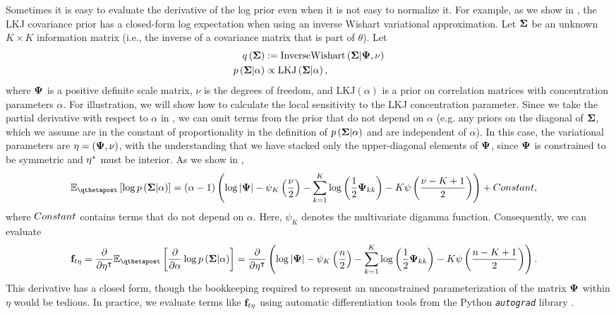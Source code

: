 \documentclass{article}\usepackage[]{graphicx}\usepackage[]{color}
\theoremstyle{plain}
\theoremstyle{definition}
\theoremstyle{plain}
\theoremstyle{plain}
\theoremstyle{plain}
\theoremstyle{plain}
\begin{document}
Sometimes it is easy to evaluate the derivative of the log prior even
when it is not easy to normalize it. For example, as we show in ,
the LKJ covariance prior \citep{lewandowski:2009:lkj} has a closed-form
log expectation when using an inverse Wishart variational approximation.
Let $\boldsymbol{\Sigma}$ be an unknown $K\times K$ information matrix (i.e.,
the inverse of a covariance matrix that is part of $\theta$). Let
\begin{align*}
q\left(\boldsymbol{\Sigma}\right) & :=\textrm{InverseWishart}\left(\boldsymbol{\Sigma}\vert\boldsymbol{\Psi},\nu\right)\\
p\left(\boldsymbol{\Sigma}\vert\alpha\right) & \propto\textrm{LKJ}\left(\boldsymbol{\Sigma}\vert\alpha\right),
\end{align*}
where $\boldsymbol{\Psi}$ is a positive definite scale matrix, $\nu$ is
the degrees of freedom, and $\textrm{LKJ}\left(\alpha\right)$ is
a prior on correlation matrices with concentration parameters $\alpha$.
For illustration, we will show how to calculate the local sensitivity
to the LKJ concentration parameter. Since we take the partial derivative
with respect to $\alpha$ in ,
we can omit terms from the prior that do not depend on $\alpha$ (e.g.
any priors on the diagonal of $\boldsymbol{\Sigma}$, which we assume are in the
constant of proportionality in the definition of $p\left(\boldsymbol{\Sigma}\vert\alpha\right)$
and are independent of $\alpha$). In this case, the variational parameters
are $\eta=\left(\boldsymbol{\Psi},\nu\right)$, with the understanding that
we have stacked only the upper-diagonal elements of $\boldsymbol{\Psi}$,
since $\boldsymbol{\Psi}$ is constrained to be symmetric and $\eta^{*}$ must
be interior. As we show in ,
\begin{align*}
\mbeq\left[\log p\left(\covmat\vert\alpha\right)\right] & =\left(\alpha-1\right)\left(\log\left|\lkjparam\right|-\psi_{K}\left(\frac{\nu}{2}\right)-\sum_{k=1}^{K}\log\left(\frac{1}{2}\lkjparam_{kk}\right)-K\psi\left(\frac{\nu-K+1}{2}\right)\right)+\constant,
\end{align*}
where $Constant$ contains terms that do not depend on $\alpha$.
Here, $\psi_{K}$ denotes the multivariate digamma function. Consequently,
we can evaluate
\begin{align}
\efhess=\frac{\partial}{\partial\eta^{\trans}}\mbeq\left[\frac{\partial}{\partial\alpha}\log p\left(\covmat\vert\alpha\right)\right] & =\frac{\partial}{\partial\eta^{\trans}}\left(\log\left|\lkjparam\right|-\psi_{K}\left(\frac{n}{2}\right)-\sum_{k=1}^{K}\log\left(\frac{1}{2}\lkjparam_{kk}\right)-K\psi\left(\frac{n-K+1}{2}\right)\right).\label{eq:lkj_prior_vb}
\end{align}
This derivative has a closed form, though the bookkeeping required
to represent an unconstrained parameterization of the matrix $\boldsymbol{\Psi}$
within $\eta$ would be tedious. In practice, we evaluate terms like
$\mathbf{f}_{t\eta}$ using automatic differentiation tools from the Python \texttt{\textit{autograd}}
library \citep{maclaurin:2015:autograd}.
\end{document}
